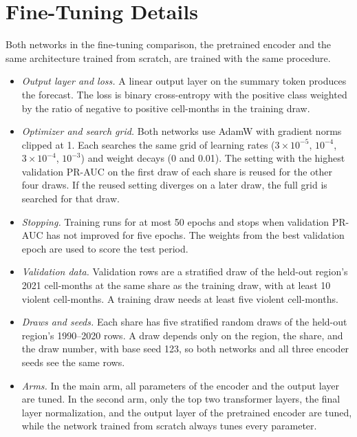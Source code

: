 \documentclass[11pt, letterpaper]{article}
\begin{document}
\section{Fine-Tuning Details}
\label{app:ft_details}
Both networks in the fine-tuning comparison, the pretrained encoder and the same architecture trained from scratch, are trained with the same procedure.
\begin{itemize}
\item \textit{Output layer and loss.} A linear output layer on the summary token produces the forecast. The loss is binary cross-entropy with the positive class weighted by the ratio of negative to positive cell-months in the training draw.
\item \textit{Optimizer and search grid.} Both networks use AdamW with gradient norms clipped at 1. Each searches the same grid of learning rates ($3\times10^{-5}$, $10^{-4}$, $3\times10^{-4}$, $10^{-3}$) and weight decays (0 and 0.01). The setting with the highest validation PR-AUC on the first draw of each share is reused for the other four draws. If the reused setting diverges on a later draw, the full grid is searched for that draw.
\item \textit{Stopping.} Training runs for at most 50 epochs and stops when validation PR-AUC has not improved for five epochs. The weights from the best validation epoch are used to score the test period.
\item \textit{Validation data.} Validation rows are a stratified draw of the held-out region's 2021 cell-months at the same share as the training draw, with at least 10 violent cell-months. A training draw needs at least five violent cell-months.
\item \textit{Draws and seeds.} Each share has five stratified random draws of the held-out region's 1990--2020 rows. A draw depends only on the region, the share, and the draw number, with base seed 123, so both networks and all three encoder seeds see the same rows.
\item \textit{Arms.} In the main arm, all parameters of the encoder and the output layer are tuned. In the second arm, only the top two transformer layers, the final layer normalization, and the output layer of the pretrained encoder are tuned, while the network trained from scratch always tunes every parameter.
\end{itemize}
\end{document}
